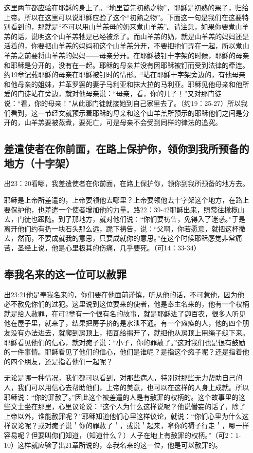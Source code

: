这里两节都应验在耶稣的身上了。“地里首先初熟之物”，耶稣是初熟的果子，归给上帝。所以在这里可以说耶稣应验了这个“初熟之物”。下面这一句是我们在这要特别看到的，那就是“不可以用山羊羔母的奶来煮山羊羔”。请注意，如果你要煮山羊羔的话，说明这个山羊羔牠是已经被杀了。而山羊羔的奶，就是山羊羔的妈妈还是活着的，你要把山羊羔的妈妈和这个山羊羔分开，不要把牠们弄在一起，所以煮山羊羔之前要将山羊羔的妈妈——母亲分开。在耶稣被钉十字架的时候，耶稣的母亲和耶稣是分开的，没有在一起。耶稣的母亲并没有因耶稣被钉而受到法律的牵连。约19章记载耶稣的母亲在耶稣被钉时的情形。“站在耶稣十字架旁边的，有他母亲和他母亲的姐妹，并革罗罢的妻子马利亚和抹大拉的马利亚。耶稣见他母亲和他所爱的门徒站在旁边，就对他母亲说：“母亲，看，你的儿子！”又对那门徒说：“看，你的母亲！”从此那门徒就接她到自己家里去了。（约19：25-27）所以我们看到，这一节经文就预示着耶稣的母亲和这个山羊羔所预示的耶稣他们之间是分开的，山羊羔要被蒸煮，要死亡，可是母亲不会受到同样的律法的追究。

\subsection{差遣使者在你前面，在路上保护你，领你到我所预备的地方（十字架）}
出23：20看哪，我差遣使者在你前面，在路上保护你，领你到我所预备的地方去。

耶稣是上帝所差遣的，上帝要领他去哪里？上帝要领他去十字架这个地方，在路上要保护他，也差遣一个使者增加他的力量。路22：39-42耶稣出来，照常往橄榄山去，门徒也跟随。到了那地方，就对他们说：“你们要祷告，免得入了迷惑。”于是离开他们约有扔一块石头那么远，跪下祷告，说：“父啊，你若愿意，就把这杯撤去，然而，不要成就我的意思，只要成就你的意思。”在这个时候耶稣感觉非常痛苦，圣经上说，他是心里极其的伤痛，几乎要死。（可14：33-34）


\subsection{奉我名来的这一位可以赦罪}
出23:21他是奉我名来的，你们要在他面前谨慎，听从他的话，不可惹他，因为他必不赦免你们的过犯。这里说到这位要来的使者，他是奉主名来的，他有一个权柄就是给人赦罪，在可2章有一个很有名的故事，就是耶稣进了迦百农，很多人听见他在屋子里，就来了，结果把房子挤的是水泄不通。有一个瘫痪的人，他的四个朋友没有办法进去，就爬到房顶上，把瓦给揭开了，就把他从房顶上用绳子缒下来。耶稣看见他们的信心，就对瘫子说：“小子，你的罪赦了。”这对我们也是很有鼓励的一件事情。耶稣看见了他们的信心，他们是谁呢？是指这个瘫子呢？还是指着他的四个朋友，还是指着他们一起呢？

无论是哪一种情况，我们都可以看到，对那些病人，特别对那些无力帮助自己的人，我们可以用信心去帮助他们，上帝的美意，也可以在这样的人身上成就。所以耶稣说：“你的罪赦了。”因此这个被差遣的人是有赦罪的权柄的。这个故事里的这些文士坐在那里，心里议论说：“这个人为什么这样说呢？他说僭妄的话了，除了上帝以外，谁能赦罪呢？”耶稣知道他们心里这样议论，就说：“你们心里为什么这样议论呢？或对瘫子说＇你的罪赦了＇，或说＇起来，拿你的褥子行走＇，哪一样容易呢？但要叫你们知道，（知道什么？）人子在地上有赦罪的权柄。”（可2：1-10）这样就应验了出21章所说的，奉我名来的这一位，他是可以赦罪的。

